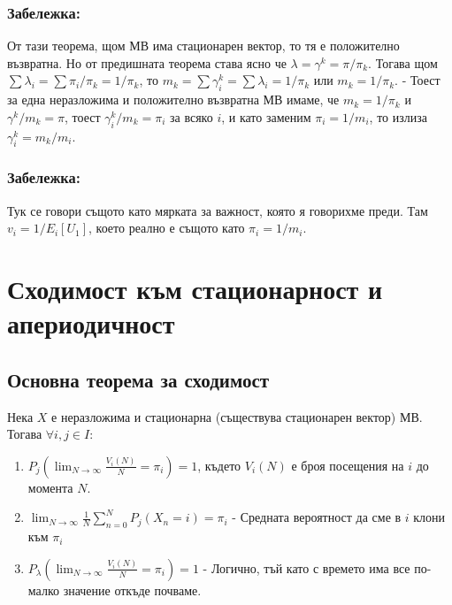 \documentclass{article}
\begin{document}
\subsubsection*{Забележка:}
От тази теорема, щом МВ има стационарен вектор, то тя е положително възвратна. Но от предишната теорема става 
ясно че $\lambda = \gamma^k = \pi/\pi_k$. Тогава щом $\sum \lambda_i = \sum \pi_i/\pi_k = 1/\pi_k$, то $m_k = \sum \gamma_i^k = \sum \lambda_i = 1/\pi_k$ или $m_k = 1/\pi_k$. 
- Тоест за една неразложима и положително възвратна МВ имаме, че $m_k = 1/\pi_k$ и $\gamma^k/m_k = \pi$, тоест $\gamma_i^k/m_k = \pi_i$ за всяко $i$, и като заменим $\pi_i = 1/m_i$, то излиза $\gamma_i^k = m_k/m_i$.

\subsubsection*{Забележка:}
Тук се говори същото като мярката за важност, която я говорихме преди. Там $v_i = 1/E_i[U_1]$, което реално е същото като $\pi_i = 1/m_i$.

\section{Сходимост към стационарност и апериодичност}

\subsection{Основна теорема за сходимост}
Нека $X$ е неразложима и стационарна (съществува стационарен вектор) МВ. Тогава $\forall i,j \in I$:
\begin{enumerate}
\item $P_j\left(\lim_{N\to\infty} \frac{V_i(N)}{N} = \pi_i\right) = 1$, където $V_i(N)$ е броя посещения на $i$ до момента $N$.
\item $\lim_{N\to\infty} \frac{1}{N}\sum_{n=0}^N P_j(X_n = i) = \pi_i$ - Средната вероятност да сме в $i$ клони към $\pi_i$
\item $P_\lambda\left(\lim_{N\to\infty} \frac{V_i(N)}{N} = \pi_i\right) = 1$ - Логично, тъй като с времето има все по-малко значение откъде почваме.
\end{enumerate}
\end{document}

